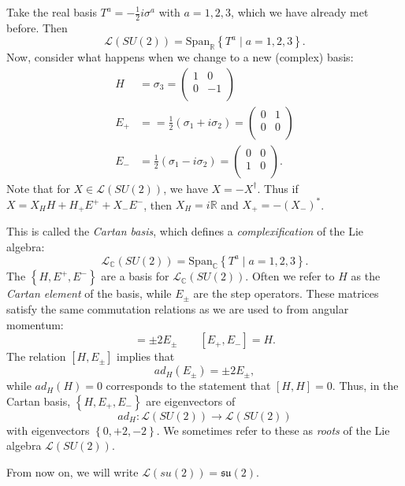 Take the real basis $T^a = - \frac{1}{2} i \sigma^a$ with $a = 1,2,3$, which we have already met before.
Then
\begin{equation}
  \mathscr{L}(SU(2)) = \text{Span}_{\mathbb{R}} \left\{ T^a \mid a = 1,2,3 \right\}.
\end{equation}
Now, consider what happens when we change to a new (complex) basis:
\begin{align}
  H &= \sigma_3 =
  \begin{pmatrix}
   1 & 0 \\
   0 & -1 \\
  \end{pmatrix} \\
  E_+ &= = \frac{1}{2} (\sigma_1 + i \sigma_2) = 
  \begin{pmatrix}
   0 & 1 \\
   0 & 0 \\
  \end{pmatrix} \\
  E_- &= \frac{1}{2} (\sigma_1 - i\sigma_2) =
  \begin{pmatrix}
   0 & 0 \\
   1 & 0 \\
  \end{pmatrix}.
\end{align}
Note that for $X \in \mathscr{L}(SU(2))$, we have $X = -X^{\dagger}$.
Thus if $X = X_H H + H_+ E^+ + X_- E^-$, then $X_H = i \mathbb{R}$ and $X_+ = -(X_-)^*$.

This is called the \emph{Cartan basis}, which defines a \emph{complexification} of the Lie algebra:
\begin{equation}
  \mathscr{L}_{\mathbb{C}} (SU(2)) = \text{Span}_{\mathbb{C}} \left\{ T^a \mid a = 1,2,3 \right\}.
\end{equation}
The $\left\{ H, E^+, E^- \right\}$ are a basis for $\mathscr{L}_{\mathbb{C}}(SU(2))$.
Often we refer to $H$ as the \emph{Cartan element} of the basis, while $E_{\pm}$ are the step operators.
These matrices satisfy the same commutation relations as we are used to from angular momentum:
\begin{equation}
  [H, E_{\pm}] = \pm 2 E_{\pm} \qquad [E_+, E_-] = H.
\end{equation}
The relation $[H, E_{\pm}]$ implies that 
\begin{equation}
  ad_{H}(E_{\pm}) = \pm 2 E_{\pm},
\end{equation}
while $ad_H(H) = 0$ corresponds to the statement that $[H, H] = 0$.
Thus, in the Cartan basis, $\left\{ H, E_+, E_- \right\}$ are eigenvectors of
\begin{equation}
  ad_H \colon \mathscr{L}(SU(2)) \to \mathscr{L}(SU(2))
\end{equation}
with eigenvectors $\left\{ 0, +2, -2 \right\}$. We sometimes refer to these as \emph{roots} of the Lie algebra $\mathscr{L}(SU(2))$.
\begin{leftbar}
  \begin{remark}
    From now on, we will write $\mathscr{L}(su(2)) = \mathfrak{su}(2)$.
  \end{remark}
\end{leftbar}

